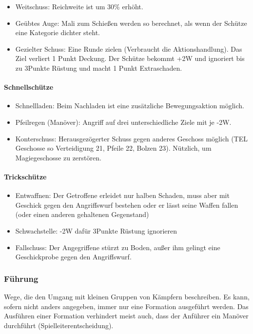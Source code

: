 \documentclass{article}
\begin{document}
\begin{itemize}
\item Weitschuss: Reichweite ist um 30\% erhöht.
\item Geübtes Auge: Mali zum Schießen werden so berechnet, als wenn der Schütze eine Kategorie dichter steht.
\item Gezielter Schuss: Eine Runde zielen (Verbraucht die Aktionshandlung). Das Ziel verliert 1 Punkt Deckung. Der Schütze bekommt +2W und ignoriert bis zu 3Punkte Rüstung und macht 1 Punkt Extraschaden.
\end{itemize}

\paragraph{Schnellschütze}

\begin{itemize}
\item Schnellladen: Beim Nachladen ist eine zusätzliche Bewegungsaktion möglich.
\item Pfeilregen (Manöver): Angriff auf drei unterschiedliche Ziele mit je -2W.
\item Konterschuss: Herausgezögerter Schuss gegen anderes Geschoss möglich (TEL Geschosse so Verteidigung 21, Pfeile 22, Bolzen 23). Nützlich, um Magiegeschosse zu zerstören.
\end{itemize}

\paragraph{Trickschütze}

\begin{itemize}
\item Entwaffnen: Der Getroffene erleidet nur halben Schaden, muss aber mit Geschick gegen den Angriffswurf bestehen oder er lässt seine Waffen fallen (oder einen anderen gehaltenen Gegenstand)
\item Schwachstelle: -2W dafür 3Punkte Rüstung ignorieren
\item Fallschuss: Der Angegriffene stürzt zu Boden, außer ihm gelingt eine Geschickprobe gegen den Angriffswurf.
\end{itemize}

\subsubsection{Führung}

Wege, die den Umgang mit kleinen Gruppen von Kämpfern beschreiben. Es kann, sofern nicht anders angegeben, immer nur
eine Formation ausgeführt werden. Das Ausführen einer Formation verhindert meist auch, dass der Anführer ein Manöver
durchführt (Spielleiterentscheidung).
\end{document}
